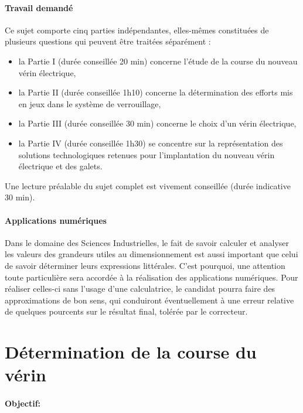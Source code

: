 \newpage
\paragraph{Travail demandé}

Ce  sujet  comporte  cinq  parties  indépendantes,  elles-mêmes  constituées  de  plusieurs questions qui peuvent être traitées séparément :
\begin{itemize}
 \item la  Partie  I  (durée  conseillée  20  min)  concerne l’étude de  la  course  du  nouveau  vérin électrique,
 \item la Partie II (durée conseillée 1h10) concerne la détermination des efforts mis en jeux dans le système de verrouillage,
 \item la Partie III (durée conseillée 30 min) concerne le choix d’un vérin électrique,
 \item la  Partie  IV  (durée  conseillée  1h30)  se  concentre  sur  la  représentation  des  solutions technologiques retenues pour l’implantation du nouveau vérin électrique et des galets.
\end{itemize}

Une lecture préalable du sujet complet est vivement conseillée (durée indicative 30 min).
 
\paragraph{Applications numériques}

Dans le domaine des Sciences Industrielles, le fait de savoir calculer et analyser les valeurs des grandeurs utiles au dimensionnement est aussi important que celui de savoir déterminer leurs expressions littérales. C’est pourquoi, une attention toute particulière sera accordée à la réalisation des applications numériques. Pour réaliser celles-ci sans l’usage d’une calculatrice, le candidat pourra faire des approximations de bon sens, qui conduiront éventuellement à une erreur relative de quelques pourcents sur le résultat final, tolérée par le correcteur.

\section{Détermination de la course du vérin}

\paragraph{Objectif:}

